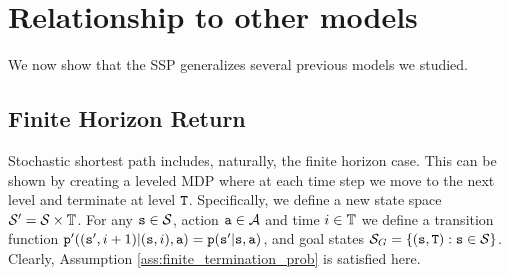 





\section{Relationship to other models}

We now show that the SSP generalizes several previous models we studied.

\subsection{Finite Horizon Return}
Stochastic shortest path includes, naturally, the finite horizon case. 
This can be shown by creating a leveled MDP where at each time step we move to the next level and terminate at level ${\tt T}$.
Specifically, we define a new state space $\mathcal{S}'=\mathcal{S}\times \mathbb{T}$.
For any ${\tt s}\in\mathcal{S}$, action ${\tt a}\in\mathcal{A}$ and time 
$i\in \mathbb{T}$  we define a transition function 
${\tt p}' (({\tt s}',i+1)|({\tt s},i),{\tt a})={\tt p}({\tt s}'|{\tt s},{\tt a})$, 
and goal states $\mathcal{S}_G=\{({\tt s},{\tt T}):{\tt s} \in\mathcal{S}\}$.
Clearly, Assumption \ref{ass:finite_termination_prob} is satisfied here.

